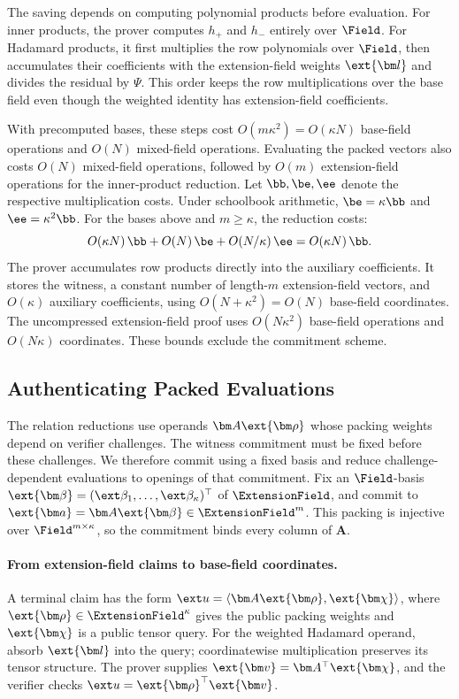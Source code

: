 The saving depends on computing polynomial products before
evaluation. For inner products, the prover computes \(h_+\) and
\(h_-\) entirely over \(\Field\).
For Hadamard products, it first multiplies the row polynomials over
\(\Field\), then accumulates their coefficients with the
extension-field weights \(\ext{\bm l}\) and divides the residual
by \(\Psi\).
This order keeps the row multiplications over the base field even
though the weighted identity has extension-field coefficients.

With precomputed bases, these steps cost
\(O(m\kappa^2)=O(\kappa N)\) base-field operations and \(O(N)\)
mixed-field operations. Evaluating the packed vectors also costs
\(O(N)\) mixed-field operations, followed by \(O(m)\) extension-field
operations for the inner-product reduction.
Let \(\bb,\be,\ee\) denote the respective multiplication costs.
Under schoolbook arithmetic,
\(\be=\kappa\bb\) and \(\ee=\kappa^2\bb\).
For the bases above and \(m\geq\kappa\), the reduction costs:
\[
    O(\kappa N)\,\bb+O(N)\,\be+O(N/\kappa)\,\ee
    =O(\kappa N)\,\bb.
\]
The prover accumulates row products directly into the auxiliary
coefficients. It stores the witness, a constant number of
length-\(m\) extension-field vectors, and \(O(\kappa)\) auxiliary
coefficients, using \(O(N+\kappa^2)=O(N)\) base-field coordinates.
The uncompressed extension-field proof uses
\(O(N\kappa^2)\) base-field operations and \(O(N\kappa)\) coordinates.
These bounds exclude the commitment scheme.

\subsection{Authenticating Packed Evaluations}
\label{sec:highlevelPCS}

The relation reductions use operands \(\bm A\ext{\bm\rho}\) whose
packing weights depend on verifier challenges.
The witness commitment must be fixed before these challenges.
We therefore commit using a fixed basis and reduce
challenge-dependent evaluations to openings of that commitment.
Fix an \(\Field\)-basis
\(\ext{\bm\beta}=(\ext\beta_1,\ldots,\ext\beta_\kappa)^\top\)
of \(\ExtensionField\), and commit to
\(\ext{\bm a}=\bm A\ext{\bm\beta}\in\ExtensionField^m\).
This packing is injective over \(\Field^{m\times\kappa}\), so the
commitment binds every column of \(\bm A\).

\paragraph{From extension-field claims to base-field coordinates.}
A terminal claim has the form
\(\ext u=\langle\bm A\ext{\bm\rho},\ext{\bm\chi}\rangle\),
where \(\ext{\bm\rho}\in\ExtensionField^\kappa\) gives the public
packing weights and \(\ext{\bm\chi}\) is a public tensor query.
For the weighted Hadamard operand, absorb \(\ext{\bm l}\) into the query;
coordinatewise multiplication preserves its tensor structure.
The prover supplies \(\ext{\bm v}=\bm A^\top\ext{\bm\chi}\), and
the verifier checks \(\ext u=\ext{\bm\rho}^{\top}\ext{\bm v}\).

